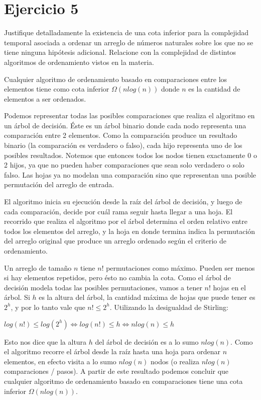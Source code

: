 \section*{Ejercicio 5}

Justifique detalladamente la existencia de una cota inferior para la complejidad temporal asociada a ordenar un arreglo de números naturales sobre los que no se tiene ninguna hipótesis adicional. Relacione con la complejidad de distintos algoritmos de ordenamiento vistos en la materia.

Cualquier algoritmo de ordenamiento basado en comparaciones entre los elementos tiene como cota inferior $\Omega(n log(n))$ donde $n$ es la cantidad de elementos a ser ordenados.

Podemos representar todas las posibles comparaciones que realiza el algoritmo en un árbol de decisión. Éste es un árbol binario donde cada nodo representa una comparación entre 2 elementos. Como la comparación produce un resultado binario (la comparación es verdadero o falso), cada hijo representa uno de los posibles resultados. Notemos que entonces todos los nodos tienen exactamente 0 o 2 hijos, ya que no pueden haber comparaciones que sean solo verdadero o solo falso. Las hojas ya no modelan una comparación sino que representan una posible permutación del arreglo de entrada.

El algoritmo inicia su ejecución desde la raíz del árbol de decisión, y luego de cada comparación, decide por cuál rama seguir hasta llegar a una hoja. El recorrido que realiza el algoritmo por el árbol determina el orden relativo entre todos los elementos del arreglo, y la hoja en donde termina indica la permutación del arreglo original que produce un arreglo ordenado según el criterio de ordenamiento.

Un arreglo de tamaño $n$ tiene $n!$ permutaciones como máximo. Pueden ser menos si hay elementos repetidos, pero ésto no cambia la cota. Como el árbol de decisión modela todas las posibles permutaciones, vamos a tener $n!$ hojas en el árbol. Si $h$ es la altura del árbol, la cantidad máxima de hojas que puede tener es $2^h$, y por lo tanto vale que $n! \leq 2^h$. Utilizando la desigualdad de Stirling:

$log(n!) \leq log(2^h) \iff log(n!) \leq h \iff n log(n) \leq h$

Esto nos dice que la altura $h$ del árbol de decisión es a lo sumo $n log(n)$. Como el algoritmo recorre el árbol desde la raíz hasta una hoja para ordenar $n$ elementos, en efecto visita a lo sumo $n log(n)$ nodos (o realiza $n log(n)$ comparaciones / pasos). A partir de este resultado podemos concluir que cualquier algoritmo de ordenamiento basado en comparaciones tiene una cota inferior $\Omega(n log(n))$.


